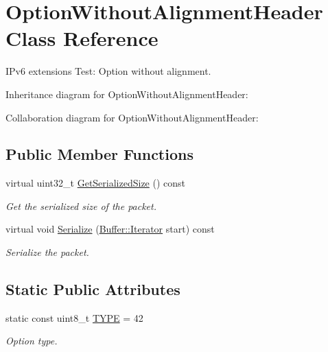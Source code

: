 \hypertarget{classOptionWithoutAlignmentHeader}{}\section{Option\+Without\+Alignment\+Header Class Reference}
\label{classOptionWithoutAlignmentHeader}


I\+Pv6 extensions Test\+: Option without alignment.  




Inheritance diagram for Option\+Without\+Alignment\+Header\+:


Collaboration diagram for Option\+Without\+Alignment\+Header\+:
\subsection*{Public Member Functions}
\begin{DoxyCompactItemize}
\item 
virtual uint32\+\_\+t \hyperlink{classOptionWithoutAlignmentHeader_a139e3e1033957cd5d562f9257ed1a57d}{Get\+Serialized\+Size} () const 
\begin{DoxyCompactList}\small\item\em Get the serialized size of the packet. \end{DoxyCompactList}\item 
virtual void \hyperlink{classOptionWithoutAlignmentHeader_a396d897aac727a9cbd4bd3a83c60e2d9}{Serialize} (\hyperlink{classns3_1_1Buffer_1_1Iterator}{Buffer\+::\+Iterator} start) const 
\begin{DoxyCompactList}\small\item\em Serialize the packet. \end{DoxyCompactList}\end{DoxyCompactItemize}
\subsection*{Static Public Attributes}
\begin{DoxyCompactItemize}
\item 
static const uint8\+\_\+t \hyperlink{classOptionWithoutAlignmentHeader_ad463c4aa80ea726e57fcd404b118ce5d}{T\+Y\+PE} = 42
\begin{DoxyCompactList}\small\item\em Option type. \end{DoxyCompactList}\end{DoxyCompactItemize}
